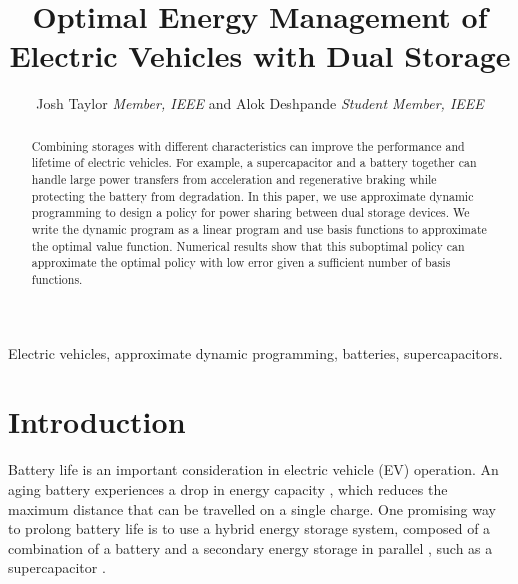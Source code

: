 \documentclass[conference]{IEEEtran}
\begin{document}
\title{Optimal Energy Management of Electric Vehicles with Dual Storage}

\author{Josh Taylor \textit{Member, IEEE} and Alok Deshpande \textit{Student Member, IEEE} %
}


\maketitle

\begin{abstract}
Combining storages with different characteristics can improve the performance and lifetime of electric vehicles. For example, a supercapacitor and a battery together can handle large power transfers from acceleration and regenerative braking while protecting the battery from degradation. In this paper, we use approximate dynamic programming to design a policy for power sharing between dual storage devices. We write the dynamic program as a linear program and use basis functions to approximate the optimal value function. Numerical results show that this suboptimal policy can approximate the optimal policy with low error given a sufficient number of basis functions.
\end{abstract}
\begin{IEEEkeywords}
Electric vehicles, approximate dynamic programming, batteries, supercapacitors.\end{IEEEkeywords}

\section{Introduction}
Battery life is an important consideration in electric vehicle (EV) operation. An aging battery experiences a drop in energy capacity \cite{8449100}, which reduces the maximum distance that can be travelled on a single charge. One promising way to prolong battery life is to use a hybrid energy storage system, composed of a combination of a battery and a secondary energy storage in parallel \cite{thounthong2009energy}, such as a supercapacitor \cite{bambang2014energy,thounthong2009energy,7939849}. 
\end{document}
